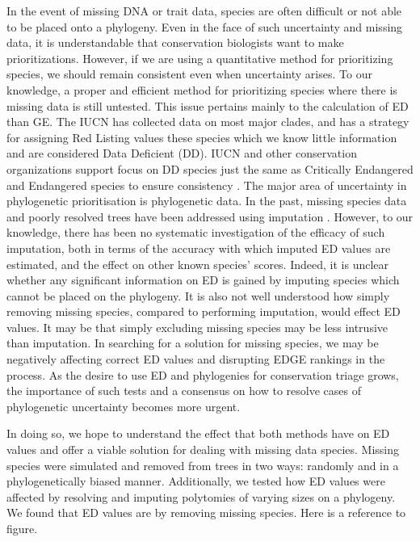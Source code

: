 \documentclass[12pt,english]{article}
\begin{document}
In the event of missing DNA or trait data, species are often difficult
or not able to be placed onto a phylogeny. Even in the face of such
uncertainty and missing data, it is understandable that conservation
biologists want to make prioritizations. However, if we are using a
quantitative method for prioritizing species, we should remain
consistent even when uncertainty arises. To our knowledge, a proper
and efficient method for prioritizing species where there is missing
data is still untested. This issue pertains mainly to the calculation
of ED than GE. The IUCN has collected data on most major clades, and
has a strategy for assigning Red Listing values these species which we
know little information and are considered Data Deficient (DD). IUCN
and other conservation organizations support focus on DD species just
the same as Critically Endangered and Endangered species to ensure
consistency \autocite{Rodrigues2006}. The major area of uncertainty in
phylogenetic prioritisation is phylogenetic data. In the past, missing
species data and poorly resolved trees have been addressed using
imputation \autocite{Collen2011, Isaac2012, Jetz2014}. However, to our
knowledge, there has been no systematic investigation of the efficacy
of such imputation, both in terms of the accuracy with which imputed
ED values are estimated, and the effect on other known species'
scores. Indeed, it is unclear whether any significant information on
ED is gained by imputing species which cannot be placed on the
phylogeny. It is also not well understood how simply removing missing
species, compared to performing imputation, would effect ED values. It
may be that simply excluding missing species may be less intrusive
than imputation. In searching for a solution for missing species, we
may be negatively affecting correct ED values and disrupting EDGE
rankings in the process. As the desire to use ED and phylogenies for
conservation triage grows, the importance of such tests and a
consensus on how to resolve cases of phylogenetic uncertainty becomes
more urgent.

  In doing so, we hope to understand the
effect that both methods have on ED values and offer a viable solution
for dealing with missing data species. Missing species were simulated
and removed from trees in two ways: randomly and in a phylogenetically
biased manner. Additionally, we tested how ED values were affected by
resolving and imputing polytomies of varying sizes on a phylogeny. We
found that ED values are by removing missing species. Here is a
reference to figure.
\end{document}

